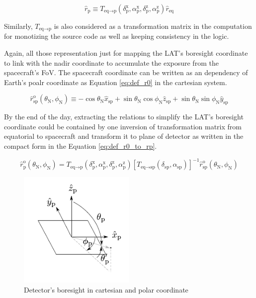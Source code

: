 \begin{equation}
    \hat{r}_\text{p} \equiv T_{\text{eq}\rightarrow\text{p}} (\delta^\text{x}_\text{p}, \alpha^\text{x}_\text{p}, \delta^\text{z}_\text{p}, \alpha^\text{z}_\text{p}) \hat{r}_\text{eq}
    \label{eq:rep_tf_eq_p}
\end{equation}

Similarly, $T_{\text{eq}\rightarrow\text{p}}$ is also considered as 
a transformation matrix in the computation for monotizing the source 
code as well as keeping consistency in the logic.

Again, all those representation just for mapping the LAT's boresight
coordinate to link with the nadir coordinate to accumulate the 
exposure from the spacecraft's FoV. The spacecraft coordinate can be 
written as an dependency of Earth's poalr coordinate as Equation \ref{eq:def_r0}
in the cartesian system.

\begin{equation}
    \hat{r}^\text{o}_\text{sp} (\theta_\text{N}, \phi_\text{N}) \equiv -\cos\theta_\text{N}\hat{x}_\text{sp} + \sin\theta_\text{N}\cos\phi_\text{N}\hat{z}_\text{sp} + \sin\theta_\text{N}\sin\phi_\text{N}\hat{y}_\text{sp}
    \label{eq:def_r0}
\end{equation}

By the end of the day, extracting the relations to simplify the 
LAT's boresight coordinate could be contained by one inversion of 
transformation matrix from equatorial to spacecraft and transform it 
to plane of detector as written in the compact form in the Equation 
\ref{eq:def_r0_to_rp}.

\begin{equation}
    \hat{r}^\text{o}_\text{p} (\theta_\text{N}, \phi_\text{N}) = T_{\text{eq}\rightarrow\text{p}} (\delta^\text{x}_\text{p}, \alpha^\text{x}_\text{p}, \delta^\text{z}_\text{p}, \alpha^\text{z}_\text{p}) \left[T_{\text{eq}\rightarrow\text{sp}} (\delta_\text{sp}, \alpha_\text{sp})\right]^{-1} \hat{r}^\text{o}_\text{sp} (\theta_\text{N}, \phi_\text{N})
    \label{eq:def_r0_to_rp}
\end{equation}

\begin{figure}[h]
    \centering
    \includegraphics[width=0.5\textwidth]{content/methodology/figures/coord_plane}
    \caption{Detector's boresight in cartesian and polar coordinate}
    \label{fig:tf_lat_pol_car}
\end{figure}

